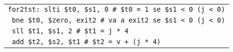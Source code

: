 \documentclass[../main.tex]{subfiles}
\begin{document}
\begin{tabular}{ l }
    \texttt{for2tst:\hspace*{0cm} slti \$t0, \$s1, 0 \hspace*{0cm} \hspace*{0cm} \hspace*{0cm} \hspace*{0cm} \hspace*{0cm} \hspace*{0cm} \# \$t0 = 1 se \$s1 < 0 (j < 0)} \\
    \texttt{\hspace*{0cm} \hspace*{0cm} \hspace*{0cm} \hspace*{0cm} \hspace*{0cm} \hspace*{0cm} \hspace*{0cm} \hspace*{0cm} \hspace*{0cm} bne \$t0, \$zero, exit2 \hspace*{0cm} \# va a exit2 se \$s1 < 0 (j < 0)} \\
    \texttt{\hspace*{0cm} \hspace*{0cm} \hspace*{0cm} \hspace*{0cm} \hspace*{0cm} \hspace*{0cm} \hspace*{0cm} \hspace*{0cm} \hspace*{0cm} sll \$t1, \$s1, 2 \hspace*{0cm} \hspace*{0cm} \hspace*{0cm} \hspace*{0cm} \hspace*{0cm} \hspace*{0cm} \hspace*{0cm} \# \$t1 = j * 4} \\
    \texttt{\hspace*{0cm} \hspace*{0cm} \hspace*{0cm} \hspace*{0cm} \hspace*{0cm} \hspace*{0cm} \hspace*{0cm} \hspace*{0cm} \hspace*{0cm} add \$t2, \$s2, \$t1 \hspace*{0cm} \hspace*{0cm} \hspace*{0cm} \hspace*{0cm} \hspace*{0cm} \# \$t2 = v + (j * 4)} \\

\end{tabular}
\end{document}

